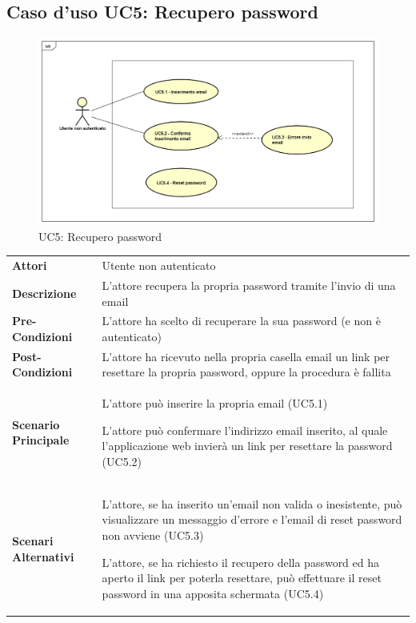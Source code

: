 \newpage
\subsection{Caso d'uso UC5: Recupero password }
\label{UC5}
\begin{figure}[ht]
	\centering
	\includegraphics[scale=0.45]{UML/UC5.png}
	\caption{UC5: Recupero password }
\end{figure}

\begin{longtable}{ l | p{11cm}}
	\hline
	\rowcolor{Gray}
	 \multicolumn{2}{c}{UC5 - Recupero password} \\
	 \hline
	\textbf{Attori} & Utente non autenticato \\
	\textbf{Descrizione} & L'attore recupera la propria password tramite l'invio di una email \\
	\textbf{Pre-Condizioni} & L'attore ha scelto di recuperare la sua password (e non è autenticato) \\
	\textbf{Post-Condizioni} & L'attore ha ricevuto nella propria casella email un link per resettare la propria password, oppure la procedura è fallita \\
	\textbf{Scenario Principale} & 
	\begin{enumerate*}[label=(\arabic*.),itemjoin={\newline}]
		\item L'attore può inserire la propria email (UC5.1)
		\item L'attore può confermare l'indirizzo email inserito, al quale l'applicazione web invierà un link per resettare la password (UC5.2)
	\end{enumerate*}\\
	\textbf{Scenari Alternativi} & 
	\begin{enumerate*}[label=(\arabic*.),itemjoin={\newline}]
		\item L'attore, se ha inserito un'email non valida o inesistente, può visualizzare un messaggio d'errore e l'email di reset password non avviene (UC5.3)
		\item L'attore, se ha richiesto il recupero della password ed ha aperto il link per poterla resettare, può effettuare il reset password in una apposita schermata (UC5.4)
	\end{enumerate*}\\
\end{longtable}